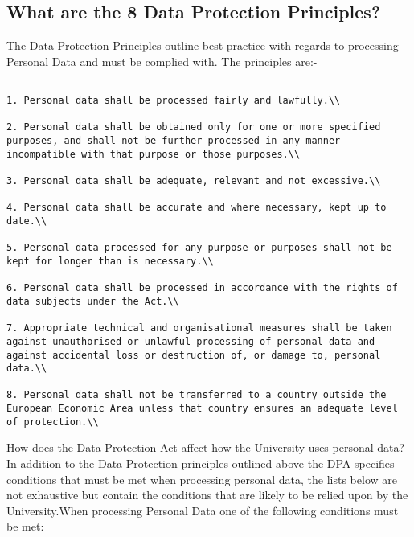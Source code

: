 \documentclass[11pt]{article} %
\begin{document}
\subsection{What are the 8 Data Protection Principles?}
The Data Protection Principles outline best practice with regards to processing Personal Data and must be complied with. The principles are:-
\begin{verbatim}

1. Personal data shall be processed fairly and lawfully.\\

2. Personal data shall be obtained only for one or more specified purposes, and shall not be further processed in any manner incompatible with that purpose or those purposes.\\

3. Personal data shall be adequate, relevant and not excessive.\\

4. Personal data shall be accurate and where necessary, kept up to date.\\

5. Personal data processed for any purpose or purposes shall not be kept for longer than is necessary.\\

6. Personal data shall be processed in accordance with the rights of data subjects under the Act.\\

7. Appropriate technical and organisational measures shall be taken against unauthorised or unlawful processing of personal data and against accidental loss or destruction of, or damage to, personal data.\\

8. Personal data shall not be transferred to a country outside the European Economic Area unless that country ensures an adequate level of protection.\\
\end{verbatim}
How does the Data Protection Act affect how the University uses personal data?
In addition to the Data Protection principles outlined above the DPA specifies conditions that must be met when processing personal data, the lists below are not exhaustive but contain the conditions that are likely to be relied upon by the University.When processing Personal Data one of the following conditions must be met:
\end{document}
